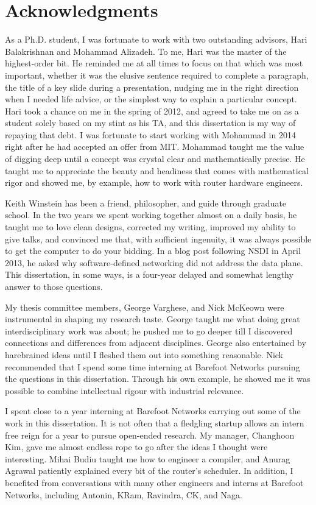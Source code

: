 \chapter*{Acknowledgments}
%

As a Ph.D. student, I was fortunate to work with two outstanding advisors, Hari
Balakrishnan and Mohammad Alizadeh. To me, Hari was the master of the
highest-order bit. He reminded me at all times to focus on that which was most
important, whether it was the elusive sentence required to complete a
paragraph, the title of a key slide during a presentation, nudging me in the
right direction when I needed life advice, or the simplest way to explain a
particular concept. Hari took a chance on me in the spring of 2012, and agreed
to take me on as a student solely based on my stint as his TA, and this
dissertation is my way of repaying that debt. I was fortunate to start working
with Mohammad in 2014 right after he had accepted an offer from MIT. Mohammad
taught me the value of digging deep until a concept was crystal clear and
mathematically precise. He taught me to appreciate the beauty and headiness
that comes with mathematical rigor and showed me, by example, how to work with
router hardware engineers.

Keith Winstein has been a friend, philosopher, and guide through graduate
school.  In the two years we spent working together almost on a daily basis, he
taught me to love clean designs, corrected my writing, improved my ability to
give talks, and convinced me that, with sufficient ingenuity, it was always
possible to get the computer to do your bidding. In a blog post following NSDI
in April 2013, he asked why software-defined networking did not address the
data plane. This dissertation, in some ways, is a four-year delayed and
somewhat lengthy answer to those questions.

My thesis committee members, George Varghese, and Nick McKeown were
instrumental in shaping my research taste. George taught me what doing great
interdisciplinary work was about; he pushed me to go deeper till I discovered
connections and differences from adjacent disciplines. George also entertained
by harebrained ideas until I fleshed them out into something reasonable. Nick
recommended that I spend some time interning at Barefoot Networks pursuing the
questions in this dissertation. Through his own example, he showed me it was
possible to combine intellectual rigour with industrial relevance.

I spent close to a year interning at Barefoot Networks carrying out some of the
work in this dissertation. It is not often that a fledgling startup allows an
intern free reign for a year to pursue open-ended research. My manager,
Changhoon Kim, gave me almost endless rope to go after the ideas I thought were
interesting. Mihai Budiu taught me how to engineer a compiler, and Anurag
Agrawal patiently explained every bit of the router's scheduler. In addition, I
benefited from conversations with many other engineers and interns at Barefoot
Networks, including Antonin, KRam, Ravindra, CK, and Naga. 

